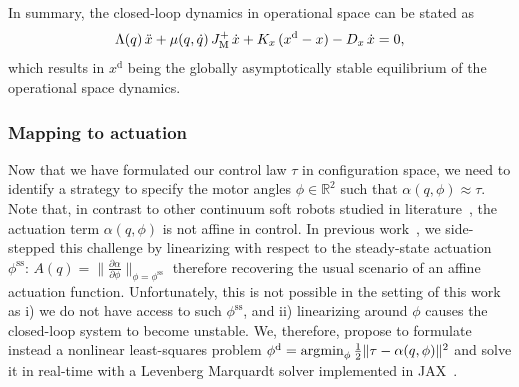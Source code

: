 
In summary, the closed-loop dynamics in operational space can be stated as
\begin{equation}\label{eq:hsacontrol:task_space_impedance_control:closed_loop_dynamics}
    \Lambda(q) \, \Ddot{x} + \mu(q,\dot{q}) \, J_\mathrm{M}^+ \, \dot{x} + K_x \, (x^\mathrm{d} - x) - D_x \, \dot{x} = 0,
\end{equation}
which results in $x^\mathrm{d}$ being the globally asymptotically stable equilibrium of the operational space dynamics.


\subsubsection{Mapping to actuation}
%
Now that we have formulated our control law $\tau$ in configuration space, we need to identify a strategy to specify the motor angles $\phi \in \mathbb{R}^2$ such that $\alpha(q,\phi) \approx \tau$. Note that, in contrast to other continuum soft robots studied in literature~\citep{della2023model}, the actuation term $\alpha(q,\phi)$ is not affine in control. %
In previous work~\citep{stolzle2024experimental}, we side-stepped this challenge by linearizing with respect to the steady-state actuation $\phi^\mathrm{ss}$: $A(q) = \lVert \frac{\partial \alpha}{\partial \phi}\rVert_{\phi=\phi^\mathrm{ss}}$ therefore recovering the usual scenario of an affine actuation function. Unfortunately, this is not possible in the setting of this work as i) we do not have access to such $\phi^\mathrm{ss}$, and ii) linearizing around $\phi$ causes the closed-loop system to become unstable. We, therefore, propose to formulate instead a nonlinear least-squares problem $\phi^\mathrm{d} = \operatorname*{\arg\!\min}_\phi \frac{1}{2} \lVert \tau - \alpha(q,\phi) \rVert^2$ and solve it in real-time with a Levenberg Marquardt solver implemented in JAX~\citep{jaxopt_implicit_diff}.

